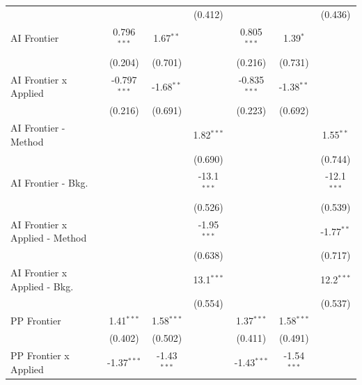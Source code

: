 \begin{tabular}{lcccccc}
                                  &                &               & (0.412)       &                &                & (0.436)\\   
   AI Frontier                    & 0.796$^{***}$  & 1.67$^{**}$   &               & 0.805$^{***}$  & 1.39$^{*}$     &   \\   
                                  & (0.204)        & (0.701)       &               & (0.216)        & (0.731)        &   \\   
   AI Frontier x Applied          & -0.797$^{***}$ & -1.68$^{**}$  &               & -0.835$^{***}$ & -1.38$^{**}$   &   \\   
                                  & (0.216)        & (0.691)       &               & (0.223)        & (0.692)        &   \\   
   AI Frontier - Method           &                &               & 1.82$^{***}$  &                &                & 1.55$^{**}$\\   
                                  &                &               & (0.690)       &                &                & (0.744)\\   
   AI Frontier - Bkg.             &                &               & -13.1$^{***}$ &                &                & -12.1$^{***}$\\   
                                  &                &               & (0.526)       &                &                & (0.539)\\   
   AI Frontier x Applied - Method &                &               & -1.95$^{***}$ &                &                & -1.77$^{**}$\\   
                                  &                &               & (0.638)       &                &                & (0.717)\\   
   AI Frontier x Applied - Bkg.   &                &               & 13.1$^{***}$  &                &                & 12.2$^{***}$\\   
                                  &                &               & (0.554)       &                &                & (0.537)\\   
   PP Frontier                    & 1.41$^{***}$   & 1.58$^{***}$  &               & 1.37$^{***}$   & 1.58$^{***}$   &   \\   
                                  & (0.402)        & (0.502)       &               & (0.411)        & (0.491)        &   \\   
   PP Frontier x Applied          & -1.37$^{***}$  & -1.43$^{***}$ &               & -1.43$^{***}$  & -1.54$^{***}$  &   \\   

\end{tabular}
